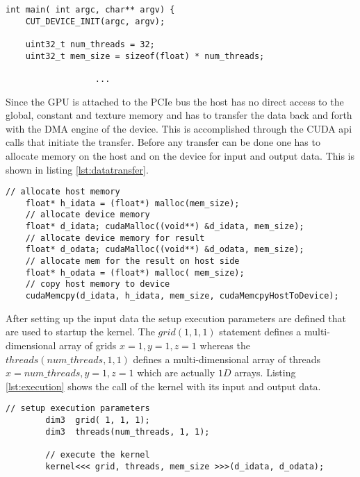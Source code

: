 %
\begin{lstlisting}[caption=Hardware initalization, label=lst:init]
int main( int argc, char** argv) {
	CUT_DEVICE_INIT(argc, argv);

	uint32_t num_threads = 32;
	uint32_t mem_size = sizeof(float) * num_threads;
	    							
                  ...
\end{lstlisting}
%

Since the \gls{GPU} is attached to the PCIe bus the host has no direct access to 
the global, constant and texture memory and has to transfer the data back
and forth with the DMA engine of the device. This is accomplished through the 
CUDA api calls that initiate the transfer. Before any transfer can be done
one has to allocate memory on the host and on the device for input and output
data. This is shown in listing \ref{lst:datatransfer}.


\begin{lstlisting}[caption=Data transfer of data, label=lst:datatransfer]
	// allocate host memory 
	float* h_idata = (float*) malloc(mem_size);
	// allocate device memory 
	float* d_idata; cudaMalloc((void**) &d_idata, mem_size);
	// allocate device memory for result
	float* d_odata; cudaMalloc((void**) &d_odata, mem_size);
	// allocate mem for the result on host side
	float* h_odata = (float*) malloc( mem_size);
	// copy host memory to device 
	cudaMemcpy(d_idata, h_idata, mem_size, cudaMemcpyHostToDevice);
\end{lstlisting}


After setting up the input data the setup execution parameters are defined that
are used to startup the kernel. The $grid(1, 1, 1)$ statement defines a
multi-dimensional array of grids $x=1, y=1, z=1$ whereas the
$threads(num\_threads, 1, 1)$ defines a multi-dimensional array of threads
$x=num\_threads, y=1, z=1$ which are actually $1D$ arrays. Listing
\ref{lst:execution} shows the call of the kernel with its input and output data.


\begin{lstlisting}[caption=Execution of the Kernel, label=lst:execution]
	    // setup execution parameters
	    dim3  grid( 1, 1, 1);
	    dim3  threads(num_threads, 1, 1);

	    // execute the kernel
	    kernel<<< grid, threads, mem_size >>>(d_idata, d_odata);

\end{lstlisting}



